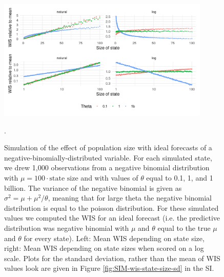 \documentclass{article}
\begin{document}
\begin{figure}[h!]
    \centering
    \includegraphics[width=0.9\textwidth]{output/figures/SIM-mean-sd-state-size.png}
    \caption{Simulation of the effect of population size with ideal forecasts of a negative-binomially-distributed variable. For each simulated state, we drew 1,000 observations from a negative binomial distribution with $\mu = 100 \cdot \text{state size}$ and with values of $\theta$ equal to 0.1, 1, and 1 billion. The variance of the negative binomial is given as $\sigma^2 = \mu + \mu^2 / \theta$, meaning that for large theta the negative binomial distribution is equal to the poisson distribution. For these simulated values we computed the WIS for an ideal forecast (i.e. the predictive distribution was negative binomial with $\mu$ and $\theta$ equal to the true $\mu$ and $\theta$ for every state). Left: Mean WIS depending on state size, right: Mean WIS depending on state sizes when scored on a log scale. Plots for the standard deviation, rather than the mean of WIS values look are given in Figure \ref{fig:SIM-wis-state-size-sd} in the SI.}. 
    \label{fig:SIM-wis-state-size-mean}
\end{figure}






\end{document}
